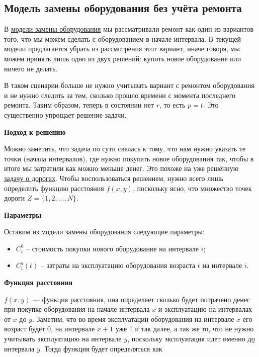 \subsection{Модель замены оборудования без учёта ремонта}


В \hyperref[def:equipment_replacement_model]{модели замены оборудования} мы рассматривали ремонт как один из вариантов того, что мы можем сделать с оборудованием в начале интервала. В текущей модели предлагается убрать из рассмотрения этот вариант, иначе говоря, мы можем принять лишь одно из двух решений: купить новое оборудование или ничего не делать.

В таком сценарии больше не нужно учитывать вариант с ремонтом оборудования и не нужно следить за тем, сколько прошло времени с момента последнего ремонта. Таким образом, теперь в состоянии нет $r$, то есть $p = t$. Это существенно упрощает решение задачи.

\bigskip

\textbf{Подход к решению}

Можно заметить, что задача по сути свелась к тому, что нам нужно указать те точки (начала интервалов), где нужно покупать новое оборудования так, чтобы в итоге мы затратили как можно меньше денег. Это похоже на уже решённую \hyperref[pr:road]{задачу о дорогах}. Чтобы воспользоваться решением, нужно всего лишь определить функцию расстояния $f(x, y)$, поскольку ясно, что множество точек дороги $Z = \{1, 2, \dots, N\}$.

\textbf{Параметры}

Оставим из модели замены оборудования следующие параметры:
\begin{itemize}[nosep]
	\item $C_i^0$ -- стоимость покупки нового оборудование на интервале $i$;
	\item $C_i^\text{э} (t)$ -- затраты на эксплуатацию оборудования возраста $t$ на интервале $i$.
\end{itemize}

\bigskip

\textbf{Функция расстояния}

$f(x,y)$ --- функция расстояния, она определяет сколько будет потрачено денег при покупке оборудования на начале интервала $x$ и эксплуатацию на интервалах от $x$ до $y$. Заметим, что во время эксплуатации оборудования на интервале $x$ его возраст будет 0, на интервале $x+1$ уже 1 и так далее, а так же то, что не нужно учитывать эксплуатацию на интервале $y$, поскольку эксплуатация идет именно \underline{до} интервала $y$. Тогда функция будет определяться как

